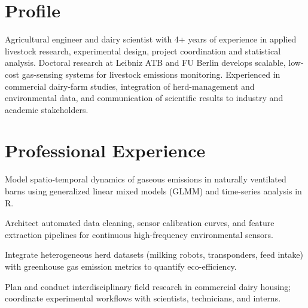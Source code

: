 \documentclass[10pt,a4paper]{article}
\begin{document}

\section*{Profile}
Agricultural engineer and dairy scientist with 4+ years of experience in applied livestock research, experimental design, project coordination and statistical analysis. Doctoral research at Leibniz ATB and FU Berlin develops scalable, low-cost gas-sensing systems for livestock emissions monitoring. Experienced in commercial dairy-farm studies, integration of herd-management and environmental data, and communication of scientific results to industry and academic stakeholders.

\section*{Professional Experience}

\begin{cvitems}

  \item Model spatio-temporal dynamics of gaseous emissions in naturally ventilated barns using generalized linear mixed models (GLMM) and time-series analysis in R.

  \item Architect automated data cleaning, sensor calibration curves, and feature extraction pipelines for continuous high-frequency environmental sensors.

  \item Integrate heterogeneous herd datasets (milking robots, transponders, feed intake) with greenhouse gas emission metrics to quantify eco-efficiency.

  \item Plan and conduct interdisciplinary field research in commercial dairy housing; coordinate experimental workflows with scientists, technicians, and interns.

\end{cvitems}
\vspace{2pt}
\end{document}

